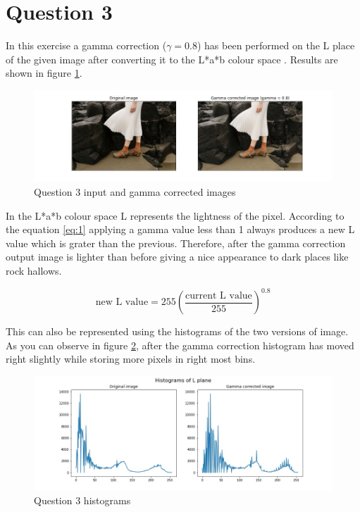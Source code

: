 \documentclass[11pt]{article}
\begin{document}
\section*{Question 3}

In this exercise a gamma correction ($\gamma = 0.8$) has been performed on the L place of the given image after converting it to the L*a*b 
colour space \cite{lab}. Results are shown in figure \ref{Question 3 input and output images}.

\begin{figure}[!h]
    \centering
    \includegraphics[width=\textwidth]{Images/31.jpg}
    \caption{Question 3 input and gamma corrected images}
    \label{Question 3 input and output images}
\end{figure}

\noindent In the L*a*b colour space L represents the lightness of the pixel. According to the equation \ref{eq:1} applying a gamma value less than
1 always produces a new L value which is grater than the previous. Therefore, after the gamma correction output image is lighter than before
giving a nice appearance to dark places like rock hallows. 

\begin{equation}\label{eq:1}
    \text{new L value} = 255\left(\frac{\text{current L value}}{255}\right)^{0.8}
\end{equation}

\noindent This can also be represented using the histograms of the two versions of image. As you can observe in figure \ref{Question 3 histograms},
after the gamma correction histogram has moved right slightly while storing more pixels in right most bins.

\begin{figure}[!h]
    \centering
    \includegraphics[width=\textwidth]{Images/32.jpg}
    \caption{Question 3 histograms}
    \label{Question 3 histograms}
\end{figure}
\end{document}
